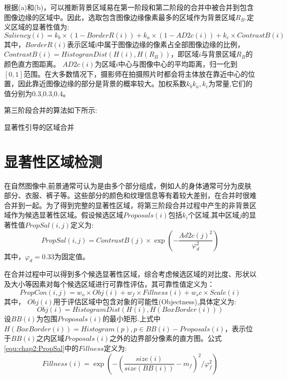 根据(a)和(b)，可以推断背景区域易在第一阶段和第二阶段的合并中被合并到包含图像边缘的区域中。因此，选取包含图像边缘像素最多的区域作为背景区域$R_B$.定义区域的显著性值为:
\begin{equation}
   \label{equ:chap2:Saliency}
   Saliency(i)=k_b \times (1-BorderR(i))+ k_a \times (1-AD2c(i)) + k_c \times ContrastB(i)
\end{equation}
其中，$BorderR(i)$表示区域i中属于图像边缘的像素占全部图像边缘的比例，$ContrastB(i)=HistogranDist(H(i),H(R_B ))$，即区域$i$与背景区域$R_B$的颜色直方图距离。 $AD2c(i)$为区域$i$中心与图像中心的平均距离，归一化到$[0,1]$范围。在大多数情况下，摄影师在拍摄照片时都会将主体放在靠近中心的位置，因此靠近图像边缘的部分是背景的概率较大。加权系数$k_b k_a,k_c$为常量,它们的值分别为0.3,0.3,0.4。\par
第三阶段合并的算法如下所示:
\renewcommand{\algorithmcfname}{算法}
\begin{algorithm}
\LinesNumbered
{}



\label{algMergeP2}
\caption{显著性引导的区域合并}
\end{algorithm}

\section{显著性区域检测}
\label{sec:saliency}

在自然图像中,前景通常可认为是由多个部分组成，例如人的身体通常可分为皮肤部分、衣服、裤子等。这些部分的颜色和纹理信息等有着较大差别，在合并时很难合并到一起。为了得到完整的显著性区域，将第三阶段合并过程中产生的非背景区域作为候选显著性区域。假设候选区域$Proposals(i)$包括$k_i$个区域,其中区域$j$的显著性值$PropSal(i,j)$定义为:
$$
   PropSal(i,j)=ContrastB(j) \times \exp{(-\frac{Ad2c(j)^2}{\varphi_d^2 })}
$$
其中，$\varphi_d=0.33$为固定值。\par
在合并过程中可以得到多个候选显著性区域，综合考虑候选区域的对比度、形状以及大小等因素对每个候选区域进行可靠性评估，其可靠性值定义为：
\begin{equation}
   \label{equ:chap2:PropSal}
   PropCon(i,j)=w_o \times Obj(i) + w_f \times Fillness(i) + w_sc \times Scale(i)
\end{equation}
其中， $Obj(i)$用于评估区域中包含对象的可能性(Objectness)\cite{objectness},具体定义为:
$$Obj(i) = HistogramDist(H(i),H(BoxBorder(i)))$$
设$BB(i)$为包围$Proposals(i)$的最小矩形.上式中$H(BoxBorder(i))=Histogram(p), p \in BB(i)-Proposals(i)$，表示位于$BB(i)$之内区域$Proposals(i)$之外的边界部分像素的直方图。公式\ref{equ:chap2:PropSal}中的$Fillness$定义为:
$$ Fillness(i) = \exp({-(\frac{size(i)}{size(BB(i))}-m_f)^2}/\varphi_f^2)$$ \par

